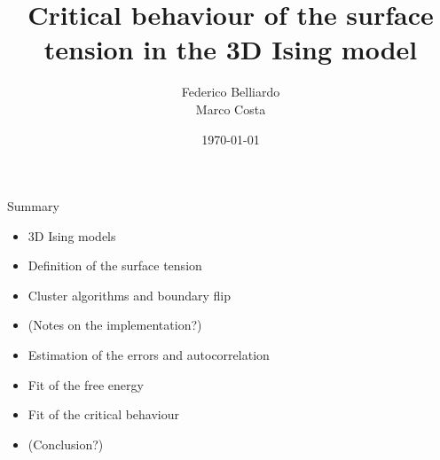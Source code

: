 \documentclass[12pt,handout]{beamer}
\title[]{Critical behaviour of the surface tension in the 3D Ising model} %
\author[]
{
Federico Belliardo \\
Marco Costa
}
\institute[] %
{
Dipartimento di Fisica\\ %
Università di Pisa \\
\medskip
}
\date{\today} %
\begin{document}
\begin{frame}
\titlepage %
\end{frame}



\begin{frame}{Summary}

\begin{center}

\begin{itemize}
\item 3D Ising models
\item Definition of the surface tension
\item Cluster algorithms and boundary flip
\item (Notes on the implementation?)
\item Estimation of the errors and autocorrelation
\item Fit of the free energy
\item Fit of the critical behaviour
\item (Conclusion?)
\end{itemize}

\end{center}
\end{frame}
\end{document}
